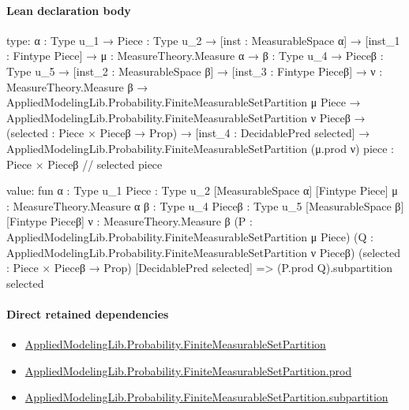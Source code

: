 \documentclass[10pt]{article}
\begin{document}
\paragraph{Lean declaration body}
\begin{ReviewVerbatim}
type:
{α : Type u_1} →
  {Piece : Type u_2} →
    [inst : MeasurableSpace α] →
      [inst_1 : Fintype Piece] →
        {μ : MeasureTheory.Measure α} →
          {β : Type u_4} →
            {Pieceβ : Type u_5} →
              [inst_2 : MeasurableSpace β] →
                [inst_3 : Fintype Pieceβ] →
                  {ν : MeasureTheory.Measure β} →
                    AppliedModelingLib.Probability.FiniteMeasurableSetPartition μ Piece →
                      AppliedModelingLib.Probability.FiniteMeasurableSetPartition ν Pieceβ →
                        (selected : Piece × Pieceβ → Prop) →
                          [inst_4 : DecidablePred selected] →
                            AppliedModelingLib.Probability.FiniteMeasurableSetPartition (μ.prod ν)
                              { piece : Piece × Pieceβ // selected piece }

value:
fun {α : Type u_1} {Piece : Type u_2} [MeasurableSpace α] [Fintype Piece] {μ : MeasureTheory.Measure α} {β : Type u_4}
    {Pieceβ : Type u_5} [MeasurableSpace β] [Fintype Pieceβ] {ν : MeasureTheory.Measure β}
    (P : AppliedModelingLib.Probability.FiniteMeasurableSetPartition μ Piece)
    (Q : AppliedModelingLib.Probability.FiniteMeasurableSetPartition ν Pieceβ) (selected : Piece × Pieceβ → Prop)
    [DecidablePred selected] =>
  (P.prod Q).subpartition selected
\end{ReviewVerbatim}

\paragraph{Direct retained dependencies}
\begin{itemize}\raggedright
\item \hyperlink{governing-declaration-774cb983dcb50264}{Applied\allowbreak{}Modeling\allowbreak{}Lib.\allowbreak{}Probability.\allowbreak{}Finite\allowbreak{}Measurable\allowbreak{}Set\allowbreak{}Partition}
\item \hyperlink{governing-declaration-778186f045078400}{Applied\allowbreak{}Modeling\allowbreak{}Lib.\allowbreak{}Probability.\allowbreak{}Finite\allowbreak{}Measurable\allowbreak{}Set\allowbreak{}Partition.\allowbreak{}prod}
\item \hyperlink{governing-declaration-393dd2b544ba66f4}{Applied\allowbreak{}Modeling\allowbreak{}Lib.\allowbreak{}Probability.\allowbreak{}Finite\allowbreak{}Measurable\allowbreak{}Set\allowbreak{}Partition.\allowbreak{}subpartition}
\end{itemize}
\hypertarget{governing-declaration-765e92a42a7a9947}{}
\end{document}
